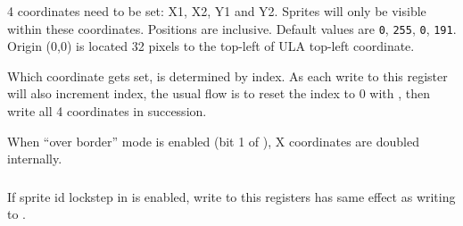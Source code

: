 4 coordinates need to be set: X1, X2, Y1 and Y2. Sprites will only be visible within these coordinates. Positions are inclusive. Default values are {\tt 0}, {\tt 255}, {\tt 0}, {\tt 191}. Origin (0,0) is located 32 pixels to the top-left of ULA top-left coordinate.

Which coordinate gets set, is determined by index. As each write to this register will also increment index, the usual flow is to reset the index to 0 with , then write all 4 coordinates in succession.

When ``over border'' mode is enabled (bit 1 of ), X coordinates are doubled internally.


\subsubsection{}



\subsubsection{}

If sprite id lockstep in  is enabled, write to this registers has same effect as writing to .

\begin{NextPort}
\end{NextPort}


\subsubsection{}

\begin{NextPort}
\end{NextPort}


\subsubsection{}

\begin{NextPort}
\end{NextPort}


